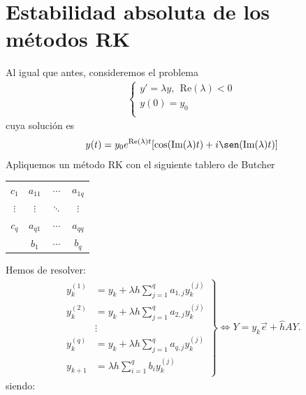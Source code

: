 \section{Estabilidad absoluta de los métodos RK}
Al igual que antes, consideremos el problema
\begin{align*}
    \left\{ \begin{array}{lcc}
                y' = \lambda y, \ \ \text{Re}(\lambda) < 0 \\
                y(0) = y_0                                 \\
            \end{array}
    \right.
\end{align*}
cuya solución es
\begin{align*}
    y(t) = y_0 e^{\text{Re}(\lambda)t}[\cos(\text{Im}(\lambda)t) + i\sen(\text{Im}(\lambda)t)]
\end{align*}
Apliquemos un método RK con el siguiente tablero de Butcher
\begin{tabular}{c|ccc}
    $c_1$    & $a_{11}$ & $\cdots$ & $a_{1q}$ \\
    $\vdots$ & $\vdots$ & $\ddots$ & $\vdots$ \\
    $c_q$    & $a_{q1}$ & $\cdots$ & $a_{qq}$ \\
    \hline
             & $b_1$    & $\cdots$ & $b_q$
\end{tabular}
Hemos de resolver:
\begin{align*}
    \left. \begin{array}{lcr}    y_k^{(1)} & = y_k + \lambda h \sum_{j=1}^{q} a_{1,j} y_k^{(j)} \\
             y_k^{(2)}          & = y_k + \lambda h \sum_{j=1}^{q} a_{2,j} y_k^{(j)} \\
                                & \vdots                                             \\
             y_k^{(q)}          & = y_k + \lambda h \sum_{j=1}^{q} a_{q,j} y_k^{(j)} \\
             y_{k+1}            & = \lambda h \sum_{i=1}^{q} b_i y_k^{(j)}
           \end{array}
    \right\} \Longleftrightarrow Y = y_k \overrightarrow{e} + \hat{h} AY.
\end{align*}
siendo:
